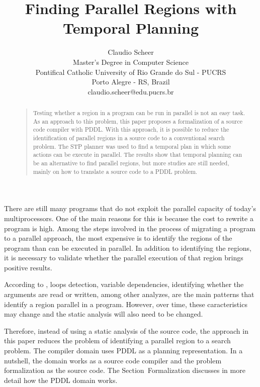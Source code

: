 \documentclass[letterpaper]{article}
\begin{document}
\title{Finding Parallel Regions with Temporal Planning}
\author{Claudio Scheer\\
    Master's Degree in Computer Science\\
    Pontifical Catholic University of Rio Grande do Sul - PUCRS\\
    Porto Alegre - RS, Brazil\\
    claudio.scheer@edu.pucrs.br\\
}
\maketitle

\begin{abstract}
    \begin{quote}
        Testing whether a region in a program can be run in parallel is not an easy task. As an approach to this problem, this paper proposes a formalization of a source code compiler with PDDL. With this approach, it is possible to reduce the identification of parallel regions in a source code to a conventional search problem. The STP planner was used to find a temporal plan in which some actions can be execute in parallel. The results show that temporal planning can be an alternative to find parallel regions, but more studies are still needed, mainly on how to translate a source code to a PDDL problem.
    \end{quote}
\end{abstract}

\noindent There are still many programs that do not exploit the parallel capacity of today's multiprocessors. One of the main reasons for this is because the cost to rewrite a program is high. Among the steps involved in the process of migrating a program to a parallel approach, the most expensive is to identify the regions of the program than can be executed in parallel. In addition to identifying the regions, it is necessary to validate whether the parallel execution of that region brings positive results.

According to \cite{doi:10.1177/1094342017695639}, loops detection, variable dependencies, identifying whether the arguments are read or written, among other analyzes, are the main patterns that identify a region parallel in a program. However, over time, these caracteristics may change and the static analysis will also need to be changed.

Therefore, instead of using a static analysis of the source code, the approach in this paper reduces the problem of identifying a parallel region to a search problem. The compiler domain uses PDDL as a planning representation. In a nutshell, the domain works as a source code compiler and the problem formalization as the source code. The Section~Formalization discusses in more detail how the PDDL domain works.
\end{document}
